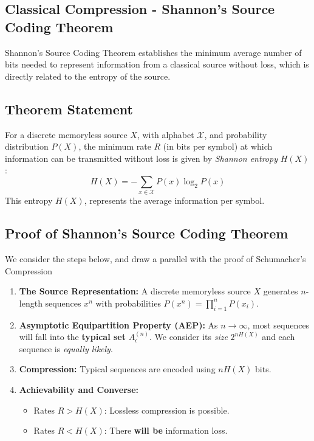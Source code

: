 \subsection{Classical Compression - Shannon's Source Coding Theorem}

Shannon’s Source Coding Theorem establishes the minimum average number of bits needed to represent information from a classical source without loss, which is directly related to the entropy of the source.

\subsection{Theorem Statement}
For a discrete memoryless source \(X\), with alphabet \(\mathcal{X}\), and probability distribution \(P(X)\), the minimum rate \(R\) (in bits per symbol) at which information can be transmitted without loss is given by \textit{Shannon entropy} \(H(X)\):
\[
H(X) = -\sum_{x \in \mathcal{X}} P(x) \log_2 P(x)
\]
This entropy \(H(X)\), represents the average information per symbol.

\subsection{Proof of Shannon's Source Coding Theorem}
We consider the steps below, and draw a parallel with the proof of Schumacher's Compression 

\begin{enumerate}
    \item \textbf{The Source Representation:} A discrete memoryless source \(X\) generates \(n\)-length sequences \(x^n\) with probabilities \(P(x^n) = \prod_{i=1}^n P(x_i)\).
    \item \textbf{Asymptotic Equipartition Property (AEP):} As \(n \to \infty\), most sequences will fall into the \textbf{typical set} \(A_\epsilon^{(n)}\).  We consider its \textit{size} \(2^{nH(X)}\) and each sequence is  \textit{equally likely}. 
    \item \textbf{Compression:} Typical sequences are encoded using \(nH(X)\) bits. 
    \item \textbf{Achievability and Converse:}
    \begin{itemize}
        \item Rates \(R > H(X)\): Lossless compression is possible.
        \item Rates \(R < H(X)\): There \textbf{will be} information loss.
    \end{itemize}
\end{enumerate}

